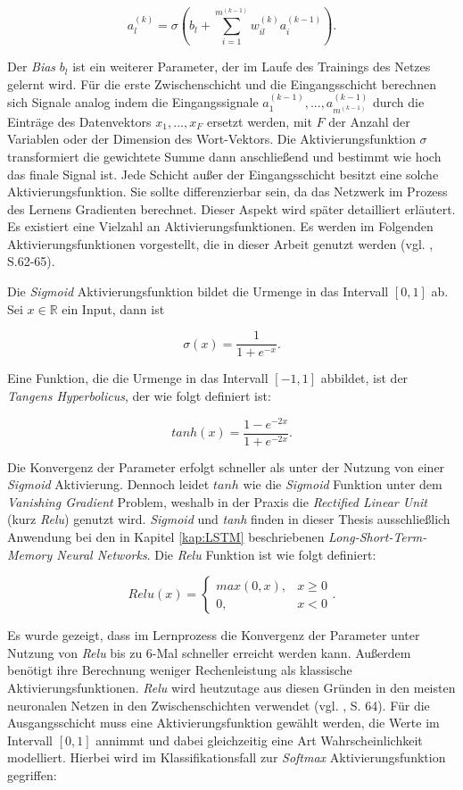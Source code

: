 \documentclass[a4paper,11pt]{article}
\begin{document}
\[ a_{l}^{(k)} = \sigma (b_l + \sum_{i=1}^{m^{(k-1)}} w_{il}^{(k)} a_{i}^{(k-1)}).\]

Der \textit{Bias} $b_l$ ist ein weiterer Parameter, der im Laufe des Trainings des Netzes gelernt wird.
Für die erste Zwischenschicht und die Eingangsschicht berechnen sich Signale analog indem die Eingangssignale $a_{1}^{(k-1)},..., a_{m^{(k-1)}}^{(k-1)}$ durch die Einträge des Datenvektors $x_1, ..., x_F$ ersetzt werden, mit $F$ der Anzahl der Variablen oder der Dimension des Wort-Vektors. Die Aktivierungsfunktion $\sigma$ transformiert die gewichtete Summe dann anschließend und bestimmt wie hoch das finale Signal ist. Jede Schicht außer der Eingangsschicht besitzt eine solche Aktivierungsfunktion. Sie sollte differenzierbar sein, da das Netzwerk im Prozess des Lernens Gradienten berechnet. Dieser Aspekt wird später detailliert erläutert. Es existiert eine Vielzahl an Aktivierungsfunktionen. Es werden im Folgenden Aktivierungsfunktionen vorgestellt, die in dieser Arbeit genutzt werden (vgl. \cite{deepEssentials}, S.62-65). 

Die \textit{Sigmoid} Aktivierungsfunktion bildet die Urmenge in das Intervall $\left[0, 1\right]$ ab. Sei $x \in \mathbb{R}$ ein Input, dann ist 

\[\sigma(x) =  \frac{1}{1+ e^{-x}}.\]

Eine Funktion, die die Urmenge in das Intervall $\left[-1, 1\right]$ abbildet, ist der \textit{Tangens Hyperbolicus}, der wie folgt definiert ist:

\[tanh(x) =  \frac{1- e^{-2x}}{1+ e^{-2x}}.\]


Die Konvergenz der Parameter erfolgt schneller als unter der Nutzung von einer \textit{Sigmoid} Aktivierung. Dennoch leidet $tanh$ wie die \textit{Sigmoid} Funktion unter dem \textit{Vanishing Gradient} Problem, weshalb in der Praxis die \textit{Rectified Linear Unit} (kurz \textit{Relu}) genutzt wird. \textit{Sigmoid} und \textit{tanh} finden in dieser Thesis ausschließlich Anwendung bei den in Kapitel \ref{kap:LSTM} beschriebenen \textit{Long-Short-Term-Memory Neural Networks}. Die \textit{Relu} Funktion ist wie folgt definiert:

\[Relu(x) = 
\begin{cases}
max(0,x), & x \geq 0 \\
0, & x <0
\end{cases}{}
.\]

Es wurde gezeigt, dass im Lernprozess die Konvergenz der Parameter unter Nutzung von \textit{Relu} bis zu 6-Mal schneller erreicht werden kann. Außerdem benötigt ihre Berechnung weniger Rechenleistung als klassische Aktivierungsfunktionen. \textit{Relu} wird heutzutage aus diesen Gründen in den meisten neuronalen Netzen in den Zwischenschichten verwendet (vgl. \cite{deepEssentials}, S. 64). Für die Ausgangsschicht muss eine Aktivierungsfunktion gewählt werden, die Werte im Intervall $\left[0, 1\right]$ annimmt und dabei gleichzeitig eine Art Wahrscheinlichkeit modelliert. Hierbei wird im Klassifikationsfall zur \textit{Softmax} Aktivierungsfunktion gegriffen:
\end{document}
